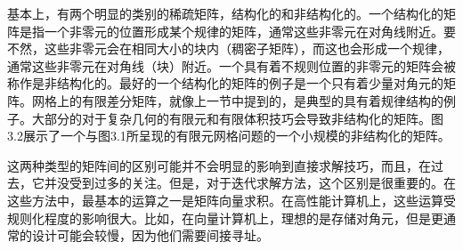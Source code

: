 \documentclass{article}
\begin{document}
基本上，有两个明显的类别的稀疏矩阵，结构化的和非结构化的。一个结构化的矩阵是指一个非零元的位置形成某个规律的矩阵，通常这些非零元在对角线附近。要不然，这些非零元会在相同大小的块内（稠密子矩阵），而这也会形成一个规律，通常这些非零元在对角线（块）附近。一个具有着不规则位置的非零元的矩阵会被称作是非结构化的。最好的一个结构化的矩阵的例子是一个只有着少量对角元的矩阵。网格上的有限差分矩阵，就像上一节中提到的，是典型的具有着规律结构的例子。大部分的对于复杂几何的有限元和有限体积技巧会导致非结构化的矩阵。图3.2展示了一个与图3.1所呈现的有限元网格问题的一个小规模的非结构化的矩阵。
\newline

这两种类型的矩阵间的区别可能并不会明显的影响到直接求解技巧，而且，在过去，它并没受到过多的关注。但是，对于迭代求解方法，这个区别是很重要的。在这些方法中，最基本的运算之一是矩阵向量求积。在高性能计算机上，这些运算受规则化程度的影响很大。比如，在向量计算机上，理想的是存储对角元，但是更通常的设计可能会较慢，因为他们需要间接寻址。
\newline
\end{document}

